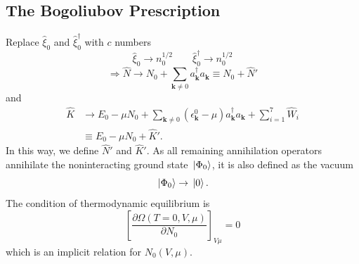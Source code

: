 \documentclass[12pt]{article}
\begin{document}
\subsection*{The Bogoliubov Prescription}
Replace $\hat{\xi}_0$ and $\hat{\xi}_0^\dagger$ with $c$ numbers 
\begin{equation}
    \hat{\xi}_0\rightarrow n_0^{1/2}\qquad\hat{\xi}_0^\dagger\rightarrow n_0^{1/2}
\end{equation}
\begin{equation}
    \Rightarrow \hat{N}\rightarrow N_0+\sum_{\mathbf{k}\neq0}a^\dagger_{\mathbf{k}}
    a_{\mathbf{k}}\equiv N_0+\hat{N}'
\end{equation}
and 
\begin{equation}
    \begin{split}
        \hat{K}&\rightarrow E_0-\mu N_0+\sum_{\mathbf{k}\neq0}(\epsilon_{\mathbf{k}}^0-\mu)
        a^\dagger_{\mathbf{k}}a_{\mathbf{k}}+\sum_{i=1}^7\hat{W}_i\\
        &\equiv E_0-\mu N_0+\hat{K}'.
    \end{split}
\end{equation}
In this way, we define $\hat{N}'$ and $\hat{K}'$. As all remaining annihilation operators 
annihilate the noninteracting ground state $\ket*{\Phi_0}$, it is also defined as the 
vacuum 
\begin{equation}
    \ket*{\Phi_0}\rightarrow \ket*{0}.
\end{equation}
The condition of thermodynamic equilibrium is 
\begin{equation}\label{equithermopotential}
    \left[\frac{\partial\Omega(T=0,V,\mu)}{\partial N_0}\right]_{V\mu}=0
\end{equation}
which is an implicit relation for $N_0(V,\mu)$.
\end{document}
